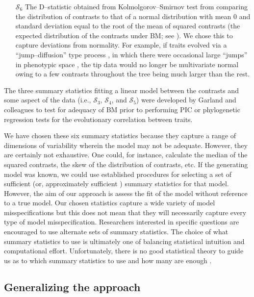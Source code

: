 \documentclass[a4paper,12pt]{article}
\begin{document}
\begin{enumerate}
\item[$\mathcal{S}_6$] The D--statistic obtained from Kolmolgorov--Smirnov test from comparing the distribution of contrasts to that of a normal distribution with mean 0 and standard deviation equal to the root of the mean of squared contrasts (the expected distribution of the contrasts under BM; see \citep{Felsenstein1985, Rohlf2001}). We chose this to capture deviations from normality. For example, if traits evolved via a ``jump--diffusion'' type process \citep{Landis2012}, in which there were occasional large ``jumps'' in phenotypic space \citep{PennellPE}, the tip data would no longer be multivariate normal owing to a few contrasts throughout the tree being much larger than the rest. 

\end{enumerate}

The three summary statistics fitting a linear model between the contrasts and some aspect of the data (i.e., $\mathcal{S}_3$, $\mathcal{S}_4$, and $\mathcal{S}_5$) were developed by Garland and colleagues \citep{Garland1992, Garland1993,  Diaz1996} to test for adequacy of BM prior to performing PIC \citep{Felsenstein1985} or phylogenetic regression \citep{Grafen1989} tests for the evolutionary correlation between traits. 

We have chosen these six summary statistics because they capture a range of dimensions of variability wherein the model may not be adequate. However, they are certainly not exhaustive. One could, for instance, calculate the median of the squared contrasts, the skew of the distribution of contrasts, etc. If the generating model was known, we could use established procedures for selecting a set of sufficient (or, approximately sufficient \citep{MajoramJoyce}) summary statistics for that model. However, the aim of our approach is assess the fit of the model without reference to a true model. Our chosen statistics capture a wide variety of model misspecifications but this does not mean that they will necessarily capture every type of model misspecification. Researchers interested in specific questions are encouraged to use alternate sets of summary statistics. The choice of what summary statistics to use is ultimately one of balancing statistical intuition and computational effort. Unfortunately, there is no good statistical theory to guide us as to which summary statistics to use and how many are enough \citep{Gelmanbook}.

\subsection*{Generalizing the approach}
\end{document}
